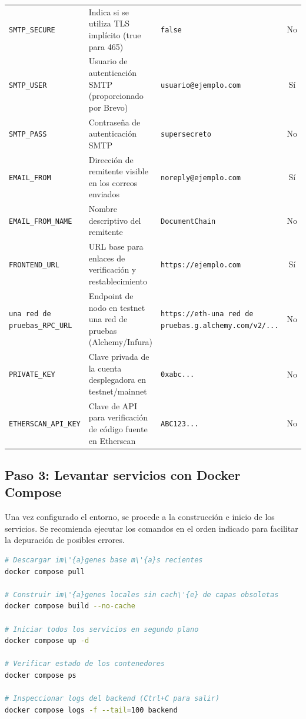 \documentclass[11pt, a4paper]{article}
\begin{document}
\begin{longtable}{@{}lp{4.5cm}p{3cm}c@{}}
\texttt{SMTP\_SECURE} & Indica si se utiliza TLS impl\'{i}cito (true para 465) & \texttt{false} & No \\
\texttt{SMTP\_USER} & Usuario de autenticaci\'{o}n SMTP (proporcionado por Brevo) & \texttt{usuario@ejemplo.com} & S\'{i} \\
\texttt{SMTP\_PASS} & Contrase\~{n}a de autenticaci\'{o}n SMTP & \texttt{supersecreto} & No \\
\texttt{EMAIL\_FROM} & Direcci\'{o}n de remitente visible en los correos enviados & \texttt{noreply@ejemplo.com} & S\'{i} \\
\texttt{EMAIL\_FROM\_NAME} & Nombre descriptivo del remitente & \texttt{DocumentChain} & No \\
\texttt{FRONTEND\_URL} & URL base para enlaces de verificaci\'{o}n y restablecimiento & \texttt{https://ejemplo.com} & S\'{i} \\
\texttt{una red de pruebas\_RPC\_URL} & Endpoint de nodo en testnet una red de pruebas (Alchemy/Infura) & \texttt{https://eth-una red de pruebas.g.alchemy.com/v2/...} & No \\
\texttt{PRIVATE\_KEY} & Clave privada de la cuenta desplegadora en testnet/mainnet & \texttt{0xabc...} & No \\
\texttt{ETHERSCAN\_API\_KEY} & Clave de API para verificaci\'{o}n de c\'{o}digo fuente en Etherscan & \texttt{ABC123...} & No \\
\end{longtable}
\label{tab:env-vars}

\subsection{Paso 3: Levantar servicios con Docker Compose}

Una vez configurado el entorno, se procede a la construcci\'{o}n e inicio de los servicios. Se recomienda ejecutar los comandos en el orden indicado para facilitar la depuraci\'{o}n de posibles errores.

\begin{lstlisting}[language=bash, caption={Construcci\'{o}n e inicio de la plataforma}]
# Descargar im\'{a}genes base m\'{a}s recientes
docker compose pull

# Construir im\'{a}genes locales sin cach\'{e} de capas obsoletas
docker compose build --no-cache

# Iniciar todos los servicios en segundo plano
docker compose up -d

# Verificar estado de los contenedores
docker compose ps

# Inspeccionar logs del backend (Ctrl+C para salir)
docker compose logs -f --tail=100 backend
\end{lstlisting}
\end{document}
